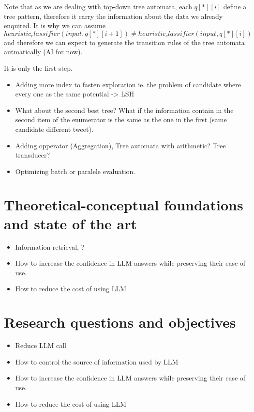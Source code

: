 \documentclass[10pt]{article}
\theoremstyle{definition}
\begin{document}
Note that as we are dealing with top-down tree automata, each $q[*][i]$ define a tree pattern, therefore it carry the information about the data we already enquired.
It is why we can assume $heuristic_classifier(input, q[*][i+1]) \neq  heuristic_classifier(input, q[*][i])$ and therefore we can expect to generate the transition rules of the tree automata autmatically (AI for now).




It is only the first step.
\begin{itemize}
    \item Adding more index to fasten exploration ie. the problem of candidate where every one as the same potential -> LSH 
    \item What about the second best tree? What if the information contain in the second item of the enumerator is the same as the one in the first (same candidate different tweet).
    \item Adding opperator (Aggregation), Tree automata with arithmetic? Tree transducer? 
    \item Optimizing batch or paralele evaluation. 
\end{itemize}


\section{Theoretical-conceptual foundations and state of the art}
\begin{itemize}
    \item Information retrieval, ? 
    \item How to increase the confidence in LLM answers while preserving their ease of use.
    \item How to reduce the cost of using LLM
\end{itemize}



\section{Research questions and objectives}
\begin{itemize}
    \item Reduce LLM call
    \item How to control the source of information used by LLM
    \item How to increase the confidence in LLM answers while preserving their ease of use.
    \item How to reduce the cost of using LLM
\end{itemize}
\end{document}

